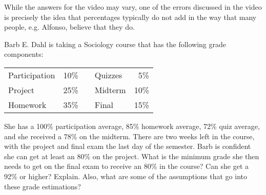 \documentclass[11pt,letterpaper]{article}
\begin{document}
While the answers for the video may vary, one of the errors discussed in the video is precisely the idea that percentages typically do not add in the way that many people, e.g. Alfonso, believe that they do. 



\newpage



 Barb E. Dahl is taking a Sociology course that has the following grade components: \par
	\begin{table}[!ht]
	\centering
	\begin{tabular}{lrclr}
	Participation & 10\% & &  Quizzes & 5\% \\
	Project & 25\% & & Midterm & 10\% \\
	Homework & 35\% & & Final & 15\% \\
	\end{tabular}
	\end{table} \par
She has a 100\% participation average, 85\% homework average, 72\% quiz average, and she received a 78\% on the midterm. There are two weeks left in the course, with the project and final exam the last day of the semester. Barb is confident she can get at least an 80\% on the project. What is the minimum grade she then needs to get on the final exam to receive an 80\% in the course? Can she get a 92\% or higher? Explain. Also, what are some of the assumptions that go into these grade estimations? \pspace
\end{document}
